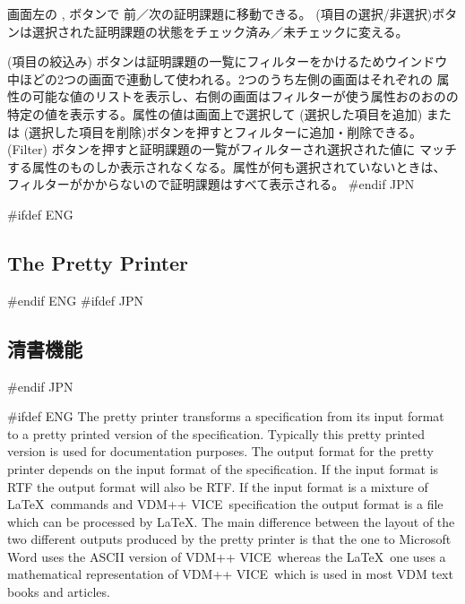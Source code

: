 \documentclass[\pformat,12pt]{article}
\newcommand{\vdmslpp}{VDM-SL}
\newcommand{\vdmslpp}{VDM++}
\renewcommand{\vdmslpp}{VDM++ VICE}
\newcommand{\guicmd}[1]{{\sf #1}}
\newcommand{\guicmd}[1]{{\gt #1}}
\begin{document}
画面左の
 ,
 ボタンで
前／次の証明課題に移動できる。 
(\guicmd{項目の選択/非選択})ボタンは選択された証明課題の状態をチェック済み／未チェックに変える。

(\guicmd{項目の絞込み}) ボタンは証明課題の一覧にフィルターをかけるためウインドウ
中ほどの2つの画面で連動して使われる。2つのうち左側の画面はそれぞれの
属性の可能な値のリストを表示し、右側の画面はフィルターが使う属性おのおのの
特定の値を表示する。属性の値は画面上で選択して%
(\guicmd{選択した項目を追加}) または%
(\guicmd{選択した項目を削除})ボタンを押すとフィルターに追加・削除できる。 %
(\guicmd{Filter}) ボタンを押すと証明課題の一覧がフィルターされ選択された値に%
マッチする属性のものしか表示されなくなる。属性が何も選択されていないときは、%
フィルターがかからないので証明課題はすべて表示される。
#endif JPN

\newpage
#ifdef ENG
\subsection{The Pretty Printer}\label{sec:pp}
#endif ENG
#ifdef JPN
\subsection{清書機能}\label{sec:pp}
#endif JPN

#ifdef ENG
The pretty printer transforms a specification from its input format to
a pretty printed version of the specification. Typically this pretty
printed version is used for documentation purposes. The output format
for the pretty printer depends on the input format of the
specification. If the input format is RTF the output format will also
be RTF. If the input format is a mixture of \LaTeX\ commands and
\vdmslpp\ specification the output format is a file which can be processed
by \LaTeX. 
The main difference between the layout of the
two different outputs produced by the pretty printer is that the one
to Microsoft Word uses the ASCII version of \vdmslpp\ whereas the
\LaTeX\ one uses a mathematical representation of \vdmslpp\ which
is used in most VDM text books and articles.
\end{document}
